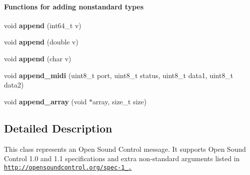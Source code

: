 \begin{Indent}\paragraph*{Functions for adding nonstandard types}
\begin{DoxyCompactItemize}
\item 
\hypertarget{classtnyosc_1_1_message_a344fd2f6ce98f1f1cf54550935d4f243}{
void {\bfseries append} (int64\_\-t v)}
\label{classtnyosc_1_1_message_a344fd2f6ce98f1f1cf54550935d4f243}

\item 
\hypertarget{classtnyosc_1_1_message_ad27ee1707ed53c12f68ee240922f3f38}{
void {\bfseries append} (double v)}
\label{classtnyosc_1_1_message_ad27ee1707ed53c12f68ee240922f3f38}

\item 
\hypertarget{classtnyosc_1_1_message_acc66286a734cc729c2e1e6e6fc7fe627}{
void {\bfseries append} (char v)}
\label{classtnyosc_1_1_message_acc66286a734cc729c2e1e6e6fc7fe627}

\item 
\hypertarget{classtnyosc_1_1_message_a192950fd01f9eb3d991d70b1720da61b}{
void {\bfseries append\_\-midi} (uint8\_\-t port, uint8\_\-t status, uint8\_\-t data1, uint8\_\-t data2)}
\label{classtnyosc_1_1_message_a192950fd01f9eb3d991d70b1720da61b}

\item 
\hypertarget{classtnyosc_1_1_message_aaa23ef199fcdf34016aeb98ec08a5d56}{
void {\bfseries append\_\-array} (void $\ast$array, size\_\-t size)}
\label{classtnyosc_1_1_message_aaa23ef199fcdf34016aeb98ec08a5d56}

\end{DoxyCompactItemize}
\end{Indent}


\subsection{Detailed Description}
This class represents an Open Sound Control message. It supports Open Sound Control 1.0 and 1.1 specifications and extra non-\/standard arguments listed in \href{http://opensoundcontrol.org/spec-1_0.}{\tt http://opensoundcontrol.org/spec-\/1\_.} 

